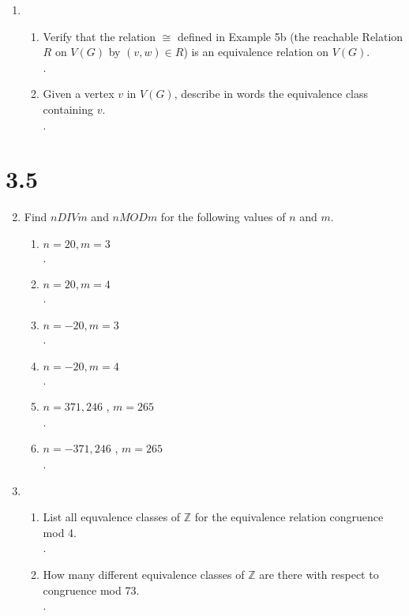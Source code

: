 \documentclass[11pt]{article}
\newcommand{\Z}{\mathbb{Z}}
\begin{document}
\begin{enumerate}
\begin{enumerate}
	.
	\end{enumerate}
\setcounter{enumi}{16}
\item 
	\begin{enumerate}
	\item Verify that the relation $\cong$ defined in Example 5b (the reachable Relation $R$ on $V(G)$ by $(v,w)\in R$) is an 
	equivalence relation on $V(G)$.\\
	.
	\item Given a vertex $v$ in $V(G)$, describe in words the equivalence class containing $v$.\\
	.
	\end{enumerate}
\end{enumerate}

\section*{3.5}
\begin{enumerate}
\setcounter{enumi}{1}
\item Find $n DIV m$ and $n MOD m$ for the following values of $n$ and $m$.
	\begin{enumerate}
	\item $n=20,m=3$\\
	.
	\item $n=20,m=4$\\
	.
	\item $n=-20,m=3$\\
	.
	\item $n=-20,m=4$\\
	.
	\item $n=371,246$ , $m=265$\\	
	.
	\item $n=-371,246$ , $m=265$\\	
	.
	\end{enumerate}
\setcounter{enumi}{3}
\item 
	\begin{enumerate}
	\item List all equvalence classes of $\Z$ for the equivalence relation congruence mod 4.\\
	.
	\item How many different equivalence classes of $\Z$ are there with respect to congruence mod 73.\\
	.
	\end{enumerate}
\end{enumerate}
\end{document}

